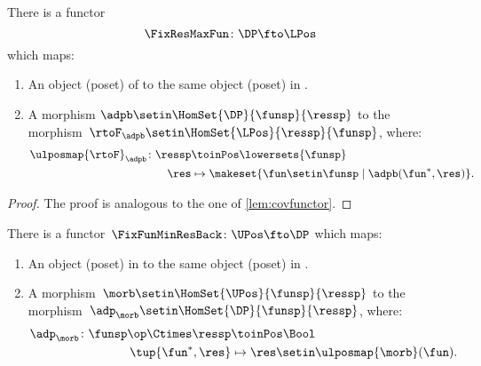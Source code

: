 \begin{lemma}
    \label{lem:confunctor}
    There is a functor
    \begin{equation}
        \FixResMaxFun\colon \DP \fto \LPos
    \end{equation}
    which maps:
    \begin{enumerate}
        \item An object (poset) of \DP to the same object (poset) in \LPos.
        \item A morphism $\adpb \setin \HomSet{\DP}{\funsp}{\ressp}$ to the morphism~$\rtoF_\adpb\setin \HomSet{\LPos}{\ressp}{\funsp}$, where:
              \begin{equation}
                  \begin{aligned}
                      \ulposmap{\rtoF}_\adpb\colon \ressp & \toinPos \lowersets{\funsp} \\
                      \res                                & \mapsto \makeset{ \fun \setin \funsp \mid \adpb(\fun^*,\res)}.
                  \end{aligned}
              \end{equation}
    \end{enumerate}
\end{lemma}

\begin{proof}
    The proof is analogous to the one of \cref{lem:covfunctor}.
\end{proof}

\begin{lemma}
    \label{lem:covfunctorback}
    There is a functor~$\FixFunMinResBack\colon \UPos \fto \DP$ which maps:
    \begin{enumerate}
        \item An object (poset) in \UPos to the same object (poset) in \DP.
        \item A morphism~$\morb\setin \HomSet{\UPos}{\funsp}{\ressp}$ to the morphism~$\adp_\morb \setin \HomSet{\DP}{\funsp}{\ressp}$, where:
              \begin{equation}
                  \begin{aligned}
                      \adp_\morb\colon \funsp\op \Ctimes \ressp & \toinPos \Bool \\
                      \tup{\fun^*,\res}                         & \mapsto \res \setin \ulposmap{\morb}(\fun).
                  \end{aligned}
              \end{equation}
    \end{enumerate}
\end{lemma}

